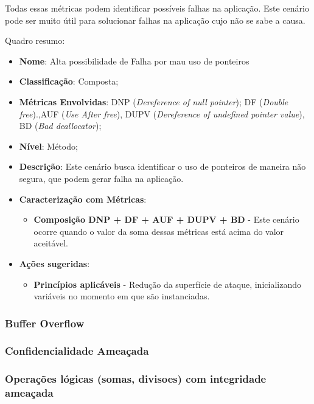 Todas essas métricas podem identificar possíveis falhas na aplicação. Este cenário pode ser muito útil para solucionar falhas na aplicação cujo não se sabe a causa.

Quadro resumo:

\begin{itemize}
\item \textbf{Nome}: Alta possibilidade de Falha por mau uso de ponteiros
\item \textbf{Classificação}: Composta;
\item \textbf{Métricas Envolvidas}: DNP (\emph{Dereference of null pointer}); DF (\emph{Double free}).,AUF (\emph{Use After free}), DUPV (\emph{Dereference of undefined pointer value}), BD (\emph{Bad deallocator});
\item \textbf{Nível}: Método;
\item \textbf{Descrição}: Este cenário busca identificar o uso de ponteiros de maneira não segura, que podem gerar falha na aplicação.
\item \textbf{Caracterização com Métricas}: 
	\begin{itemize}
	\item \textbf{Composição DNP + DF + AUF + DUPV + BD} - Este cenário ocorre quando o valor da soma dessas métricas está acima do valor aceitável.
	\end{itemize}
\item \textbf{Ações sugeridas}: 
	\begin{itemize}
	\item \textbf{Princípios aplicáveis} - Redução da superfície de ataque, inicializando variáveis no momento em que são instanciadas.
	\end{itemize}
\end{itemize}


\subsubsection{Buffer Overflow}


\subsubsection{Confidencialidade Ameaçada}


\subsubsection{Operações lógicas (somas, divisoes) com integridade ameaçada}


